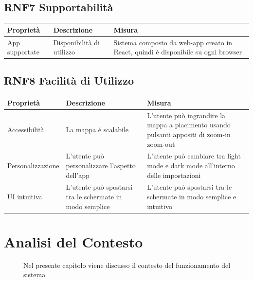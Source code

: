 \documentclass{article}
\let\origthesubsection\thesubsection
\begin{document}
\subsection{RNF7 Supportabilità}
\begin{center}
    \begin{longtable}{|p{4cm}|p{8cm}|p{4cm}|}
        \hline
        Proprietà      & Descrizione               & Misura                                                                            \\
        \hline
        App supportate & Disponibilità di utilizzo & Sistema composto da web-app creato in React, quindi è disponibile su ogni browser \\
        \hline
    \end{longtable}
\end{center}
\subsection{RNF8 Facilità di Utilizzo}
\begin{center}
    \begin{longtable}{|p{4cm}|p{8cm}|p{4cm}|}
        \hline
        Proprietà         & Descrizione                                              & Misura                                                                                     \\
        \hline
        Accessibilità     & La mappa è scalabile                                     & L'utente può ingrandire la mappa a piacimento usando pulsanti appositi di zoom-in zoom-out \\
        \hline
        Personalizzazione & L'utente può personalizzare l'aspetto dell'app           & L'utente può cambiare tra light mode e dark mode all'interno delle impostazioni            \\
        \hline
        UI intuitiva      & L'utente può spostarsi tra le schermate in modo semplice & L'utente può spostarsi tra le schermate in modo semplice e intuitivo                       \\
        \hline
    \end{longtable}
\end{center}
\renewcommand\thesubsection{\origthesubsection}
\clearpage
\section{Analisi del Contesto}
\begin{description}
    \item[] Nel presente capitolo viene discusso il contesto del funzionamento del sistema
\end{description}
\end{document}
